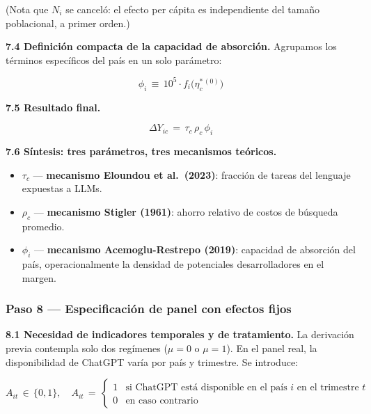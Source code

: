 \documentclass[11pt,a4paper]{article}
\theoremstyle{definition}
\begin{document}
(Nota que $N_i$ se canceló: el efecto per cápita es independiente del tamaño poblacional, a primer orden.)

\textbf{7.4 Definición compacta de la capacidad de absorción.} Agrupamos los términos específicos del país en un solo parámetro:

\begin{equation}
\phi_i \,\equiv\, 10^5\cdot f_i\!\bigl(\eta_c^{*\,(0)}\bigr)
\label{eq:phi}
\end{equation}

\textbf{7.5 Resultado final.}

\begin{equation}
\boxed{\;\Delta Y_{ic} \,=\, \tau_c\,\rho_c\,\phi_i\;}
\label{eq:deltaYic}
\end{equation}

\textbf{7.6 Síntesis: tres parámetros, tres mecanismos teóricos.}
\begin{itemize}[leftmargin=*]
  \item $\tau_c$ --- \textbf{mecanismo Eloundou et al.\ (2023)}: fracción de tareas del lenguaje expuestas a LLMs.
  \item $\rho_c$ --- \textbf{mecanismo Stigler (1961)}: ahorro relativo de costos de búsqueda promedio.
  \item $\phi_i$ --- \textbf{mecanismo Acemoglu-Restrepo (2019)}: capacidad de absorción del país, operacionalmente la densidad de potenciales desarrolladores en el margen.
\end{itemize}

\subsubsection*{Paso 8 --- Especificación de panel con efectos fijos}

\textbf{8.1 Necesidad de indicadores temporales y de tratamiento.} La derivación previa contempla solo dos regímenes ($\mu = 0$ o $\mu = 1$). En el panel real, la disponibilidad de ChatGPT varía por país y trimestre. Se introduce:

\begin{equation}
A_{it} \,\in\, \{0, 1\}, \quad A_{it} \,=\, \begin{cases}
1 & \text{si ChatGPT está disponible en el país } i \text{ en el trimestre } t\\
0 & \text{en caso contrario}
\end{cases}
\end{equation}
\end{document}
